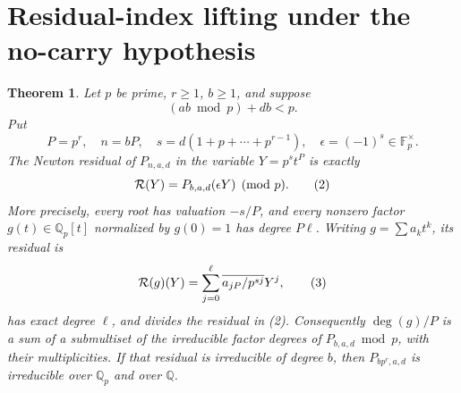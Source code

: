 \documentclass[11pt]{article}
\newtheorem{theorem}{Theorem}
\newcommand{\Q}{\mathbb Q}
\newcommand{\Fp}{\mathbb F_p}
\begin{document}
\section{Residual-index lifting under the no-carry hypothesis}

\begin{theorem}\label{thm:residual-index}
Let $p$ be prime, $r\ge1$, $b\ge1$, and suppose
\[
 (ab\bmod p)+db<p.
 \tag{1}
\]
Put
\[
 P=p^r,\quad n=bP,\quad
 s=d(1+p+\cdots+p^{r-1}),\quad \epsilon=(-1)^s\in\Fp^\times .
\]
The Newton residual of $P_{n,a,d}$ in the variable $Y=p^s t^P$ is exactly
\[
 {\cal R}(Y)=P_{b,a,d}(\epsilon Y)\pmod p.
 \tag{2}
\]
More precisely, every root has valuation $-s/P$, and every nonzero
factor $g(t)\in\Q_p[t]$ normalized by $g(0)=1$ has degree $P\ell$.
Writing $g=\sum a_kt^k$, its residual is
\[
 {\cal R}(g)(Y)=
 \sum_{j=0}^{\ell}\overline{a_{jP}/p^{sj}}Y^j,
 \tag{3}
\]
has exact degree $\ell$, and divides the residual in (2).
Consequently $\deg(g)/P$ is a sum of a submultiset of the irreducible
factor degrees of $P_{b,a,d}\bmod p$, with their multiplicities.
If that residual is irreducible of degree $b$, then
$P_{bp^r,a,d}$ is irreducible over $\Q_p$ and over $\Q$.
\end{theorem}
\end{document}
